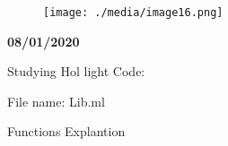 \documentclass[12pt]{article}
\renewcommand{\_}{\kern-1.5pt\textunderscore\kern-1.5pt}
\begin{document}

\par


\vspace{\baselineskip}



\begin{figure}[H]
	\begin{FlushLeft}		\texttt{[image: ./media/image16.png]}
	\end{FlushLeft}\end{figure}



\par


\vspace{\baselineskip}

\vspace{\baselineskip}

\vspace{\baselineskip}

\vspace{\baselineskip}

\vspace{\baselineskip}

\vspace{\baselineskip}

\vspace{\baselineskip}
\begin{FlushLeft}
{\fontsize{14pt}{16.8pt}\selectfont \textbf{08/01/2020}\par}
\end{FlushLeft}\par

{\fontsize{14pt}{16.8pt}\selectfont Studying Hol light Code:\par}\par


\vspace{\baselineskip}
{\fontsize{14pt}{16.8pt}\selectfont File name: Lib.ml\par}\par


\vspace{\baselineskip}
{\fontsize{14pt}{16.8pt}\selectfont Functions Explantion\par}\par
\end{document}
